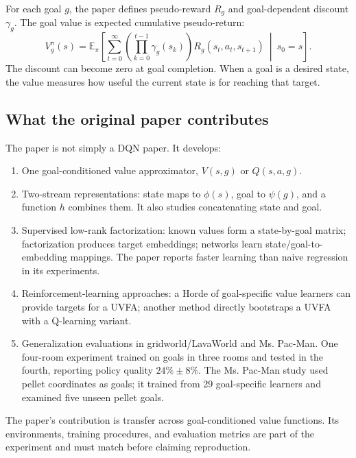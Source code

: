 \documentclass[11pt,a4paper]{article}
\begin{document}
For each goal $g$, the paper defines pseudo-reward $R_g$ and goal-dependent discount $\gamma_g$. The goal value is expected cumulative pseudo-return:
\[
V_g^\pi(s)=\mathbb{E}_\pi\left[
\sum_{t=0}^{\infty}\left(\prod_{k=0}^{t-1}\gamma_g(s_k)\right)
R_g(s_t,a_t,s_{t+1})\ \middle|\ s_0=s\right].
\]
The discount can become zero at goal completion. When a goal is a desired state, the value measures how useful the current state is for reaching that target.

\subsection{What the original paper contributes}
The paper is not simply a DQN paper. It develops:
\begin{enumerate}
\item One goal-conditioned value approximator, $V(s,g)$ or $Q(s,a,g)$.
\item Two-stream representations: state maps to $\phi(s)$, goal to $\psi(g)$, and a function $h$ combines them. It also studies concatenating state and goal.
\item Supervised low-rank factorization: known values form a state-by-goal matrix; factorization produces target embeddings; networks learn state/goal-to-embedding mappings. The paper reports faster learning than naive regression in its experiments.
\item Reinforcement-learning approaches: a Horde of goal-specific value learners can provide targets for a UVFA; another method directly bootstraps a UVFA with a Q-learning variant.
\item Generalization evaluations in gridworld/LavaWorld and Ms. Pac-Man. One four-room experiment trained on goals in three rooms and tested in the fourth, reporting policy quality $24\%\pm8\%$. The Ms. Pac-Man study used pellet coordinates as goals; it trained from 29 goal-specific learners and examined five unseen pellet goals.
\end{enumerate}
The paper's contribution is transfer across goal-conditioned value functions. Its environments, training procedures, and evaluation metrics are part of the experiment and must match before claiming reproduction.
\end{document}
